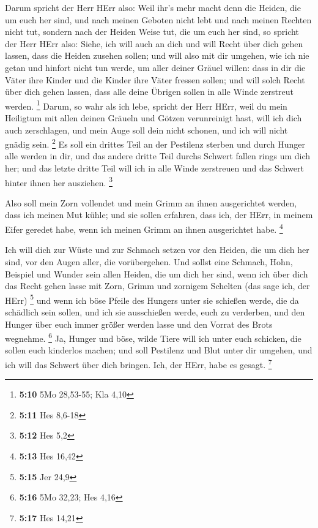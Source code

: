 Darum spricht der Herr HErr also: Weil ihr's mehr macht
denn die Heiden, die um euch her sind, und nach meinen Geboten nicht
lebt und nach meinen Rechten nicht tut, sondern nach der Heiden Weise
tut, die um euch her sind,  so spricht der Herr HErr also:
Siehe, ich will auch an dich und will Recht über dich gehen lassen, dass
die Heiden zusehen sollen;  und will also mit dir umgehen,
wie ich nie getan und hinfort nicht tun werde, um aller deiner Gräuel
willen:  dass in dir die Väter ihre Kinder und die Kinder
ihre Väter fressen sollen; und will solch Recht über dich gehen lassen,
dass alle deine Übrigen sollen in alle Winde zerstreut werden.
\footnote{\textbf{5:10} 5Mo 28,53-55; Kla 4,10}  Darum, so
wahr als ich lebe, spricht der Herr HErr, weil du mein Heiligtum mit
allen deinen Gräueln und Götzen verunreinigt hast, will ich dich auch
zerschlagen, und mein Auge soll dein nicht schonen, und ich will nicht
gnädig sein. \footnote{\textbf{5:11} Hes 8,6-18}  Es soll
ein drittes Teil an der Pestilenz sterben und durch Hunger alle werden
in dir, und das andere dritte Teil durchs Schwert fallen rings um dich
her; und das letzte dritte Teil will ich in alle Winde zerstreuen und
das Schwert hinter ihnen her ausziehen. \footnote{\textbf{5:12} Hes 5,2}

 Also soll mein Zorn vollendet und mein Grimm an ihnen
ausgerichtet werden, dass ich meinen Mut kühle; und sie sollen erfahren,
dass ich, der HErr, in meinem Eifer geredet habe, wenn ich meinen Grimm
an ihnen ausgerichtet habe. \footnote{\textbf{5:13} Hes 16,42}

 Ich will dich zur Wüste und zur Schmach setzen vor den
Heiden, die um dich her sind, vor den Augen aller, die vorübergehen.
 Und sollst eine Schmach, Hohn, Beispiel und Wunder sein
allen Heiden, die um dich her sind, wenn ich über dich das Recht gehen
lasse mit Zorn, Grimm und zornigem Schelten (das sage ich, der HErr)
\footnote{\textbf{5:15} Jer 24,9}  und wenn ich böse Pfeile
des Hungers unter sie schießen werde, die da schädlich sein sollen, und
ich sie ausschießen werde, euch zu verderben, und den Hunger über euch
immer größer werden lasse und den Vorrat des Brots wegnehme. \footnote{\textbf{5:16}
  5Mo 32,23; Hes 4,16}  Ja, Hunger und böse, wilde Tiere
will ich unter euch schicken, die sollen euch kinderlos machen; und soll
Pestilenz und Blut unter dir umgehen, und ich will das Schwert über dich
bringen. Ich, der HErr, habe es gesagt. \footnote{\textbf{5:17} Hes
  14,21}

